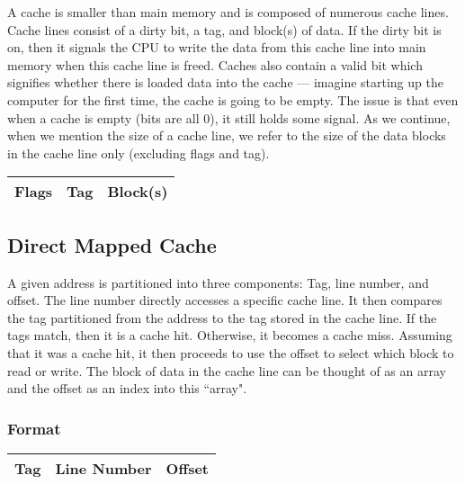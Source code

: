 \documentclass[11pt]{article}
\begin{document}
\noindent A cache is smaller than main memory and is composed of numerous cache lines. Cache lines consist of a dirty bit, a tag, and block(s) of data. If the dirty bit is on, then it signals the CPU to write the data from this cache line into main memory when this cache line is freed. Caches also contain a valid bit which signifies whether there is loaded data into the cache --- imagine starting up the computer for the first time, the cache is going to be empty. The issue is that even when a cache is empty (bits are all 0), it still holds some signal. As we continue, when we mention the size of a cache line, we refer to the size of the data blocks in the cache line only (excluding flags and tag).

\begin{table}[H]
	\centering
	\begin{tabular}{| c | c | c |}
		\hline
		Flags	&	\hspace{.5cm} Tag \hspace{.5cm} 		&	\hspace{1cm} Block(s) \hspace{1cm} \\
		\hline
	\end{tabular}
\end{table}

\subsection{Direct Mapped Cache}

A given address is partitioned into three components: Tag, line number, and offset. The line number directly accesses a specific cache line. It then compares the tag partitioned from the address to the tag stored in the cache line. If the tags match, then it is a cache hit. Otherwise, it becomes a cache miss. Assuming that it was a cache hit, it then proceeds to use the offset to select which block to read or write. The block of data in the cache line can be thought of as an array and the offset as an index into this ``array".

\subsubsection{Format}

\begin{table}[H]
	\centering
	\begin{tabular}{| c | c | c |}
		\hline
		Tag		&	Line Number		&		 Offset\\
		\hline
	\end{tabular}
\end{table}
\end{document}
